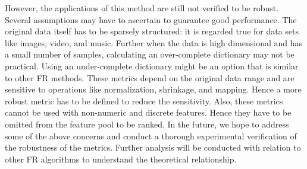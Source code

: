 However, the applications of this method are still not verified to be robust. Several assumptions may have to ascertain to guarantee good performance. The original data itself has to be sparsely structured: it is regarded true for data sets like images, video, and music. Further when the data is high dimensional and has a small number of samples, calculating an over-complete dictionary may not be practical. Using an under-complete dictionary might be an option that is similar to other FR methods. These metrics depend on the original data range and are sensitive to operations like normalization, shrinkage, and mapping. Hence a more robust metric has to be defined to reduce the sensitivity. Also, these metrics cannot be used with non-numeric and discrete features. Hence they have to be omitted from the feature pool to be ranked. In the future, we hope to address some of the above concerns and conduct a thorough experimental verification of the robustness of the metrics. Further analysis will be conducted with relation to other FR algorithms to understand the theoretical relationship.
